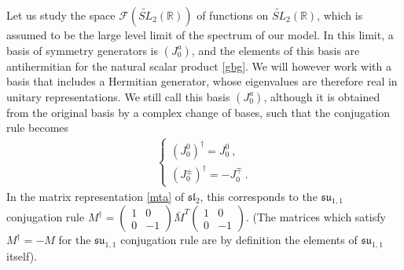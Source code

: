\documentclass[12pt, a4paper, notitlepage, twoside]{report}
\numberwithin{equation}{section}
\theoremstyle{break}
\begin{document}
Let us study the space $\mathcal{F}(\widetilde{SL}_2(\mathbb{R}))$ of functions on $\widetilde{SL}_2(\mathbb{R})$, which is assumed to be the large level limit of the spectrum of our model. 
In this limit, a basis of symmetry generators is $(J^a_0)$, and the elements of this basis are antihermitian for the natural scalar product \eqref{gbg}.
We will however work with a basis that includes a Hermitian generator, whose eigenvalues are therefore real in unitary representations.
We still call this basis $(J^a_0)$, although it is obtained from the original basis by a complex change of bases, such that the conjugation rule becomes
\begin{align}
 \left\{\begin{array}{l} (J_0^0)^\dagger = J_0^0\ , \\
         (J_0^\pm)^\dagger = -J_0^\mp \ .
        \end{array}
\right.
\label{jtdj}
\end{align}
In the matrix representation \eqref{mta} of $\mathfrak{sl}_2$, this corresponds to the $\mathfrak{su}_{1,1}$ conjugation rule $M^\dagger = \left(\begin{smallmatrix} 1 & 0 \\ 0 & -1 \end{smallmatrix}\right) \bar{M}^T \left(\begin{smallmatrix} 1 & 0 \\ 0 & -1 \end{smallmatrix}\right)$. (The matrices which satisfy $M^\dagger =-M$ for the $\mathfrak{su}_{1,1}$ conjugation rule are by definition the elements of $\mathfrak{su}_{1,1}$ itself). 
\end{document}
